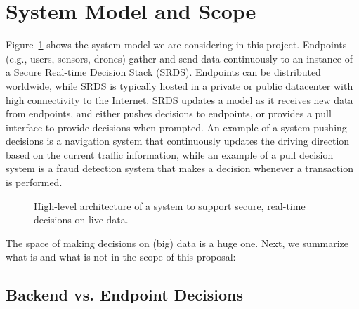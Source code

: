 \section{System Model and Scope}


Figure~\ref{figure:model} shows the system model we are considering in this project. Endpoints (e.g., users, sensors, drones) gather and send data continuously to an instance of a Secure Real-time Decision Stack (SRDS). Endpoints can be distributed worldwide, while SRDS is typically hosted in a private or public datacenter with high connectivity to the Internet. SRDS updates a model as it receives new data from endpoints, and either pushes decisions to endpoints, or provides a pull interface to provide decisions when prompted. An example of a system pushing decisions is a navigation system that continuously updates the driving direction based on the current traffic information, while an example of a pull decision system  is a fraud detection system that makes a decision whenever a transaction is performed.

\0
\begin{figure}[h]
 \caption{\small{High-level architecture of a system to support secure, real-time decisions on live data.}}
  \label{figure:model}
\end{figure}

The space of making decisions on (big) data is a huge one. Next, we summarize what is and what is not in the scope of this proposal:

\subsection{Backend vs. Endpoint Decisions}

